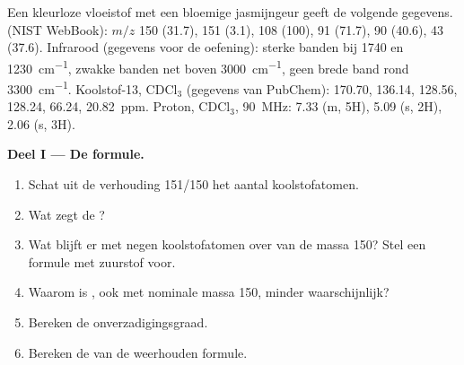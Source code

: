 \begin{problem}
\label{pb:b2:structure-determination:1}
Een kleurloze vloeistof met een bloemige jasmijngeur geeft de volgende gegevens.  (NIST
WebBook): $m/z$ 150 (31.7), 151 (3.1), 108 (100), 91 (71.7), 90 (40.6), 43 (37.6). Infrarood (gegevens voor de
oefening): sterke banden bij 1740 en \qty{1230}{cm^{-1}}, zwakke banden net boven \qty{3000}{cm^{-1}}, geen
brede band rond \qty{3300}{cm^{-1}}. Koolstof-13, CDCl$_3$ (gegevens van PubChem): 170.70, 136.14, 128.56,
128.24, 66.24, 20.82~ppm. Proton, CDCl$_3$, \qty{90}{MHz}: 7.33 (m, 5H), 5.09 (s, 2H), 2.06 (s, 3H).

\begin{center}
\end{center}

\medskip
\noindent\textbf{Deel I --- De formule.}
\begin{enumerate}
  \item Schat uit de verhouding 151/150 het aantal koolstofatomen.
  \item Wat zegt de ?
  \item Wat blijft er met negen koolstofatomen over van de massa 150? Stel een formule met zuurstof voor.
  \item Waarom is , ook met nominale massa 150, minder waarschijnlijk?
  \item Bereken de onverzadigingsgraad.
  \item Bereken de  van de weerhouden formule.
\end{enumerate}


\end{problem}
